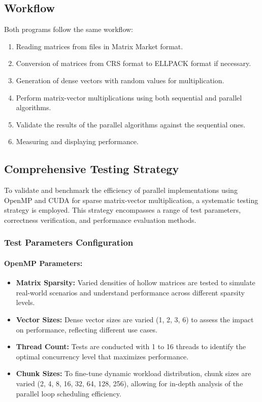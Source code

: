 \documentclass[12pt,oneside]{book} %
\begin{document}
\subsection{Workflow}

Both programs follow the same workflow:

\begin{enumerate}
    \item Reading matrices from files in Matrix Market format.
    \item Conversion of matrices from CRS format to ELLPACK format if necessary.
    \item Generation of dense vectors with random values for multiplication.
    \item Perform matrix-vector multiplications using both sequential and parallel
          algorithms.
    \item Validate the results of the parallel algorithms against the sequential ones.
    \item Measuring and displaying performance.
\end{enumerate}

\subsection{Comprehensive Testing Strategy}

To validate and benchmark the efficiency of parallel implementations using
OpenMP and CUDA for sparse matrix-vector multiplication, a systematic testing
strategy is employed. This strategy encompasses a range of test parameters,
correctness verification, and performance evaluation methods.

\subsubsection{Test Parameters Configuration}

\paragraph{OpenMP Parameters:}
\begin{itemize}
    \item \textbf{Matrix Sparsity:} Varied densities of hollow matrices are tested to simulate real-world scenarios and understand performance across different sparsity levels.
    \item \textbf{Vector Sizes:} Dense vector sizes are varied (1, 2, 3, 6) to assess the impact on performance, reflecting different use cases.
    \item \textbf{Thread Count:} Tests are conducted with 1 to 16 threads to identify the optimal concurrency level that maximizes performance.
    \item \textbf{Chunk Sizes:} To fine-tune dynamic workload distribution, chunk sizes are varied (2, 4, 8, 16, 32, 64, 128, 256), allowing for in-depth analysis of the parallel loop scheduling efficiency.
\end{itemize}
\end{document}
